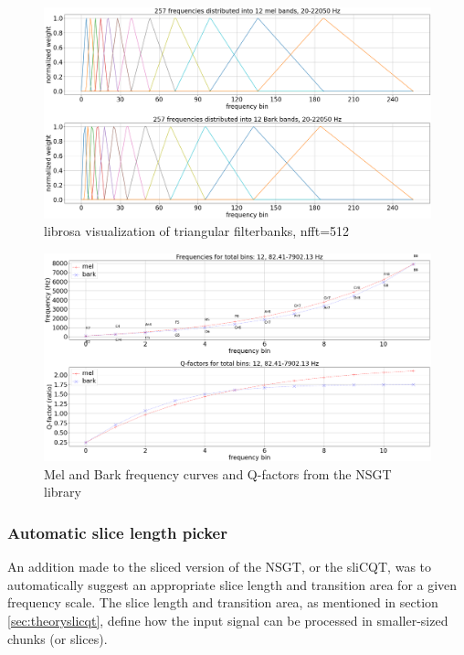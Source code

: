 \documentclass[report.tex]{subfiles}
\begin{document}
\begin{figure}[ht]
	\centering
	\includegraphics[width=\textwidth]{./images-freqscales/melbarks.png}
	\caption{librosa visualization of triangular filterbanks, nfft=512}
	\label{fig:melbarkbands}
\end{figure}

\begin{figure}[ht]
	\centering
	\includegraphics[width=\textwidth]{./images-freqscales/melbarkpitchesqs.png}
	\caption{Mel and Bark frequency curves and Q-factors from the NSGT library}
	\label{fig:melbarkfsandqs}
\end{figure}

\subsubsection{Automatic slice length picker}

An addition made to the sliced version of the NSGT, or the sliCQT, was to automatically suggest an appropriate slice length and transition area for a given frequency scale. The slice length and transition area, as mentioned in section \ref{sec:theoryslicqt}, define how the input signal can be processed in smaller-sized chunks (or slices).
\end{document}
